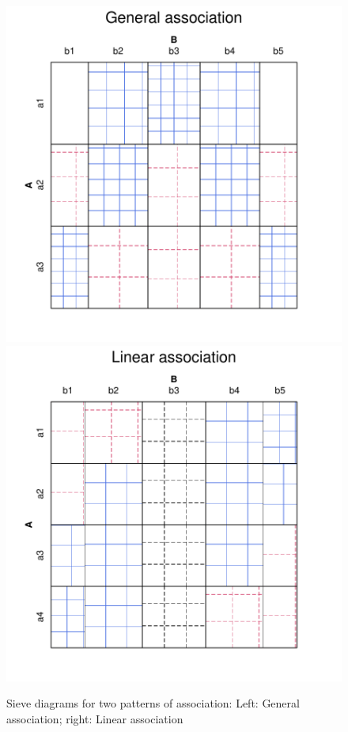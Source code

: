 \documentclass[11pt]{book}
\renewenvironment{knitrout}{\small\renewcommand{\baselinestretch}{.85}}{} %
\begin{document}
\begin{knitrout}
\color{fgcolor}\begin{kframe}
\begin{alltt}
 \hlstd{=}\hlstd{,} \hlstd{=}\hlstd{,}
   \hlstd{=} \hlstd{(} \hlstd{=} \hlstd{,}  \hlstd{=} \hlstd{(}\hlstd{,} \hlstd{)))}
 \hlstd{=}\hlstd{,} \hlstd{=}\hlstd{,}
   \hlstd{=} \hlstd{(} \hlstd{=} \hlstd{,}  \hlstd{=} \hlstd{(}\hlstd{,} \hlstd{)))}
\end{alltt}
\end{kframe}\begin{figure}[!htbp]


\centerline{\includegraphics[width=.49\textwidth]{ch04/fig/cmhdemo1} 
\includegraphics[width=.49\textwidth]{ch04/fig/cmhdemo2} }

\caption[Sieve diagrams for two patterns of association]{Sieve diagrams for two patterns of association: Left: General association; right: Linear association\label{fig:cmhdemo}}
\end{figure}


\end{knitrout}
\end{document}
